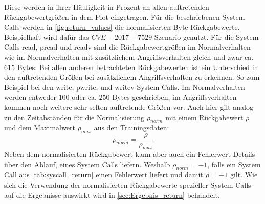                 Diese werden in ihrer Häufigkeit in Prozent an allen auftretenden Rückgabewertgrößen in dem Plot eingetragen. 
                Für die beschriebenen System Calls werden in \autoref{fig:return_values} die normalisierten Byte Rückgabewerte.                
                Beispielhaft wird dafür das $CVE-2017-7529$ Szenario genutzt.
                Für die System Calls read, pread und readv sind die Rückgabewertgrößen im Normalverhalten wie im Normalverhalten mit zusätzlichem Angriffsverhalten gleich und zwar ca.\ $615$ Bytes.
                Bei allen anderen betrachteten Rückgabewerten ist ein Unterschied in den auftretenden Größen bei zusätzlichem Angriffsverhalten zu erkennen.
                So zum Beispiel bei den write, pwrite, und writev System Calls.
                Im Normalverhalten werden entweder $100$ oder ca. $250$ Bytes geschrieben, im Angriffsverhalten kommen noch weitere sehr selten auftretende Größen vor.
                Auch hier gilt analog zu den Zeitabständen für die Normalisierung $\rho_{norm}$ mit einem Rückgabewert $\rho$ und dem Maximalwert $\rho_{max}$ aus den Trainingsdaten:
                \begin{equation}\label{eq:return_norm}
                    \rho_{norm} = \frac{\rho}{\rho_{max}}
                \end{equation}
                Neben dem normalisierten Rückgabewert kann aber auch ein Fehlerwert Details über den Ablauf, eines System Calls liefern.
                Weshalb $\rho_{norm} = -1$, falls ein System Call aus \autoref{tab:syscall_return} einen Fehlerwert liefert und damit $\rho = -1$ gilt.
                Wie sich die Verwendung der normalisierten Rückgabewerte spezieller System Calls auf die Ergebnisse auswirkt wird in \autoref{sec:Ergebnis_return} behandelt.
                
